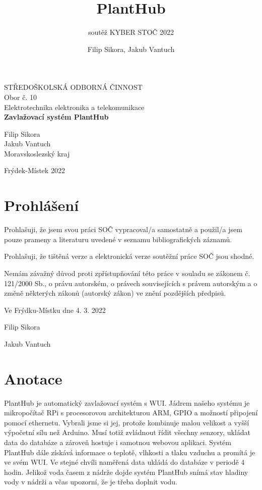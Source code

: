 \documentclass[12pt,a4paper]{article}
\title{PlantHub}
\subtitle{soutěž KYBER STOČ 2022 }
\author{Filip Sikora, Jakub Vantuch}
\date{}
\newcommand*\wildcard[2][5cm]{\vspace*{2cm}\parbox{#1}{\centering\hrulefill\par#2\par}}
\begin{document}
\begin{titlepage}
	\begin{center}
		\LARGE{STŘEDOŠKOLSKÁ ODBORNÁ ČINNOST}
		\vspace{0.5cm} \\
		\Large{Obor č. 10\\ Elektrotechnika elektronika a telekomunikace}
		\vspace{7cm} \\
		\Huge\textbf{Zavlažovací systém PlantHub}
		\vfill
		\normalsize
		\begin{minipage}{0.7\linewidth}
			Filip Sikora \\
			Jakub Vantuch \\
			Moravskoslezský kraj
		\end{minipage}%
		\begin{minipage}{0.25\linewidth}
			Frýdek-Místek 2022
		\end{minipage}
	\end{center}

\end{titlepage}

\section*{Prohlášení}

Prohlašuji, že jsem svou práci SOČ vypracoval/a samostatně a použil/a jsem
pouze prameny a literaturu uvedené v seznamu bibliografických záznamů.

Prohlašuji, že tištěná verze a elektronická verze soutěžní práce SOČ jsou
shodné.

Nemám závažný důvod proti zpřístupňování této práce v souladu se zákonem č.
121/2000 Sb., o právu autorském, o právech souvisejících s právem autorským a o
změně některých zákonů (autorský zákon) ve znění pozdějších předpisů.

Ve Frýdku-Místku dne 4. 3. 2022

\begingroup
  \centering
  \wildcard{Filip Sikora}
  \hspace{1cm}
  \wildcard{Jakub Vantuch}
  \par
\endgroup

\clearpage

\section*{Anotace}

PlantHub je automatický zavlažovací systém s WUI.
Jádrem našeho systému je mikropočítač RPi s procesorovou architekturou ARM,
GPIO a možností připojení pomocí ethernetu.
Vybrali jsme si jej, protože kombinuje malou velikost a vyšší výpočetní sílu
než Arduino. Musí totiž zvládnout řídit všechny senzory, ukládat data do
databáze a zároveň hostuje i samotnou webovou aplikaci. Systém PlantHub dále
získává informace o teplotě, vlhkosti a tlaku vzduchu a promítá je ve svém
WUI. Ve stejné chvíli naměřená data ukládá do databáze v periodě 4
hodin. Jelikož voda časem z nádrže dojde systém PlantHub snímá stav hladiny
vody v nádrži a včas upozorní, že je třeba doplnit vodu.
\end{document}
